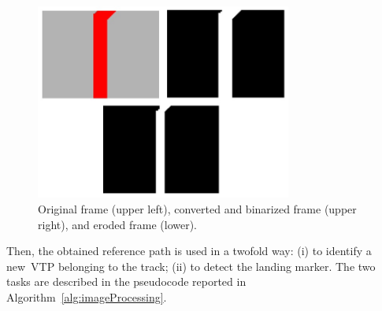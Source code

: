 \begin{figure}
	\centering
	\includegraphics[width=0.75\textwidth]{figure/Part1/Chapter3/figures/bin_ero_track.jpg}
	\caption{Original frame (upper left),  converted and binarized frame (upper right), and eroded frame (lower).}
	\label{fig:preprocessing}
\end{figure}

Then, the obtained reference path is used in a twofold way: (i) to identify a new~\gls{VTP} belonging to the track; (ii) to detect the landing marker. The two tasks are described in the pseudocode reported in Algorithm~\ref{alg:imageProcessing}.

